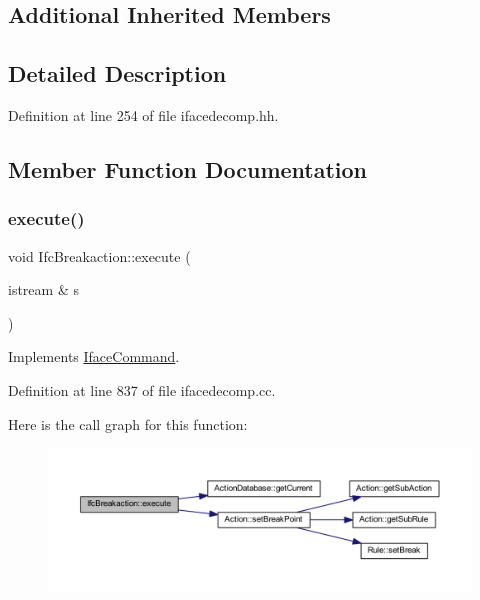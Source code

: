 \subsection*{Additional Inherited Members}


\subsection{Detailed Description}


Definition at line 254 of file ifacedecomp.\+hh.



\subsection{Member Function Documentation}
\mbox{\label{class_ifc_breakaction_ae02d475f7ddb0c84174542d9b88656a7}} 
\subsubsection{\texorpdfstring{execute()}{execute()}}
{\footnotesize\ttfamily void Ifc\+Breakaction\+::execute (\begin{DoxyParamCaption}\item[{istream \&}]{s }\end{DoxyParamCaption})\hspace{0.3cm}{\ttfamily [virtual]}}



Implements \mbox{\hyperlink{class_iface_command_af10e29cee2c8e419de6efe9e680ad201}{Iface\+Command}}.



Definition at line 837 of file ifacedecomp.\+cc.

Here is the call graph for this function\+:
\nopagebreak
\begin{figure}[H]
\begin{center}
\leavevmode
\includegraphics[width=350pt]{class_ifc_breakaction_ae02d475f7ddb0c84174542d9b88656a7_cgraph}
\end{center}
\end{figure}


